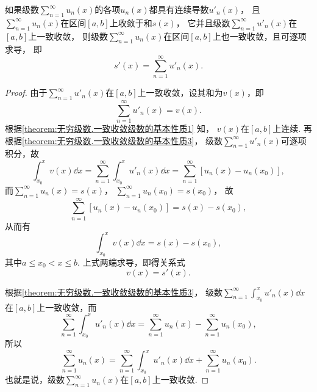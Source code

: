 \begin{property}\label{theorem:无穷级数.一致收敛级数的基本性质4}
如果级数\(\sum_{n=1}^\infty u_n(x)\)的各项\(u_n(x)\)都具有连续导数\(u'_n(x)\)，
且\(\sum_{n=1}^\infty u_n(x)\)在区间\([a,b]\)上收敛于和\(s(x)\)，
它并且级数\(\sum_{n=1}^\infty u'_n(x)\)在\([a,b]\)上一致收敛，
则级数\(\sum_{n=1}^\infty u_n(x)\)在区间\([a,b]\)上也一致收敛，且可逐项求导，
即\[
	s'(x) = \sum_{n=1}^\infty u'_n(x).
\]
\begin{proof}
由于\(\sum_{n=1}^\infty u'_n(x)\)在\([a,b]\)上一致收敛，设其和为\(v(x)\)，即\[
	\sum_{n=1}^\infty u'_n(x) = v(x).
\]
根据\cref{theorem:无穷级数.一致收敛级数的基本性质1} 知，
\(v(x)\)在\([a,b]\)上连续.
再根据\cref{theorem:无穷级数.一致收敛级数的基本性质3}，
级数\(\sum_{n=1}^\infty u'_n(x)\)可逐项积分，故\[
	\int_{x_0}^x v(x) \dd{x}
	= \sum_{n=1}^\infty \int_{x_0}^x u'_n(x) \dd{x}
	= \sum_{n=1}^\infty [u_n(x) - u_n(x_0)],
\]
而\(\sum_{n=1}^\infty u_n(x) = s(x)\)，
\(\sum_{n=1}^\infty u_n(x_0) = s(x_0)\)，
故\[
	\sum_{n=1}^\infty [u_n(x) - u_n(x_0)]
	= s(x) - s(x_0),
\]
从而有\[
	\int_{x_0}^x v(x) \dd{x} = s(x) - s(x_0),
\]
其中\(a \leq x_0 < x \leq b\).
上式两端求导，即得关系式\[
	v(x) = s'(x).
\]

根据\cref{theorem:无穷级数.一致收敛级数的基本性质3}，
级数\(\sum_{n=1}^\infty \int_{x_0}^x u'_n(x) \dd{x}\)在\([a,b]\)上一致收敛，而\[
	\sum_{n=1}^\infty \int_{x_0}^x u'_n(x) \dd{x}
	= \sum_{n=1}^\infty u_n(x)
		- \sum_{n=1}^\infty u_n(x_0),
\]所以\[
	\sum_{n=1}^\infty u_n(x)
	= \sum_{n=1}^\infty \int_{x_0}^x u'_n(x) \dd{x}
	+ \sum_{n=1}^\infty u_n(x_0).
\]也就是说，级数\(\sum_{n=1}^\infty u_n(x)\)在\([a,b]\)上一致收敛.
\end{proof}
\end{property}
